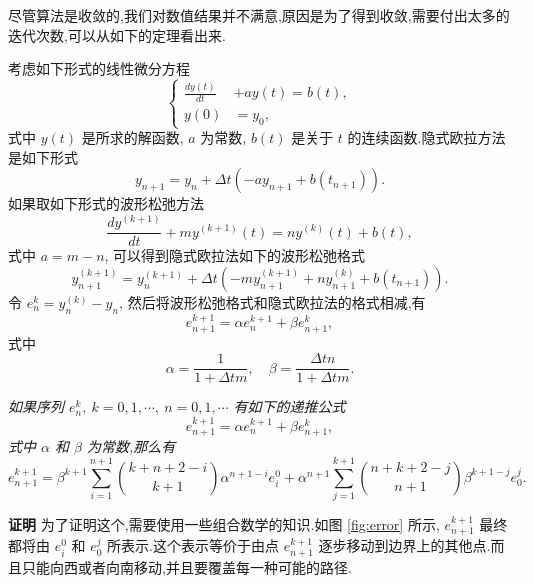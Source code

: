 尽管算法是收敛的,我们对数值结果并不满意,原因是为了得到收敛,需要付出太多的迭代次数,可以从如下的定理看出来.

考虑如下形式的线性微分方程
\begin{equation*}
  \left\{
    \begin{aligned}
      \frac{dy(t)}{dt}&+ay(t)=b(t),\\
      y(0)&=y_{0},
    \end{aligned}
  \right.
\end{equation*}
式中 $y(t)$ 是所求的解函数, $a$ 为常数, $b(t)$ 是关于 $t$ 的连续函数.隐式欧拉方法是如下形式
\begin{equation*}
  y_{n+1}=y_{n}+\Delta t (-a y_{n+1}+b(t_{n+1})).
\end{equation*}
如果取如下形式的波形松弛方法
\begin{equation*}
  \frac{dy^{(k+1)}}{dt}+m y^{(k+1)}(t) = n y^{(k)}(t) + b(t),
\end{equation*}
式中 $a=m-n$, 可以得到隐式欧拉法如下的波形松弛格式
\begin{equation*}
  y_{n+1}^{(k+1)}=y_{n}^{(k+1)}+\Delta t(-m y_{n+1}^{(k+1)}+n y_{n+1}^{(k)} +b(t_{n+1})).
\end{equation*}
令 $e_{n}^{k}=y_{n}^{(k)}-y_{n}$, 然后将波形松弛格式和隐式欧拉法的格式相减,有
\begin{equation*}
  e_{n+1}^{k+1}=\alpha e_{n}^{k+1} + \beta e_{n+1}^{k},
\end{equation*}
式中
\begin{equation*}
  \alpha = \frac{1}{1+\Delta t m}, \quad \beta = \frac{\Delta t n}{1+\Delta t m}.
\end{equation*}

\begin{lemma}\label{lem:error} \emph{如果序列
  $e_{n}^{k},~k =0,1,\cdots,~n=0,1,\cdots$ 有如下的递推公式
  \begin{equation*}
    e_{n+1}^{k+1}=\alpha e_{n}^{k+1} + \beta e_{n+1}^{k},
  \end{equation*}
  式中 $\alpha$ 和 $\beta$ 为常数,那么有
  \begin{equation*}
    e_{n+1}^{k+1}=\beta^{k+1} \sum_{i=1}^{n+1} \binom{k+n+2-i}{k+1} \alpha^{n+1-i}e_{i}^{0} + \alpha^{n+1} \sum_{j=1}^{k+1}\binom{n+k+2-j}{n+1} \beta^{k+1-j}e_{0}^{j}.
  \end{equation*}}
\end{lemma}

{\textbf{证明}} 为了证明这个,需要使用一些组合数学的知识.如图 \ref{fig:error} 所示, $e_{n+1}^{k+1}$ 最终都将由 $e_{i}^{0}$ 和 $e_{0}^{j}$ 所表示.这个表示等价于由点 $e_{n+1}^{k+1}$ 逐步移动到边界上的其他点.而且只能向西或者向南移动,并且要覆盖每一种可能的路径.

